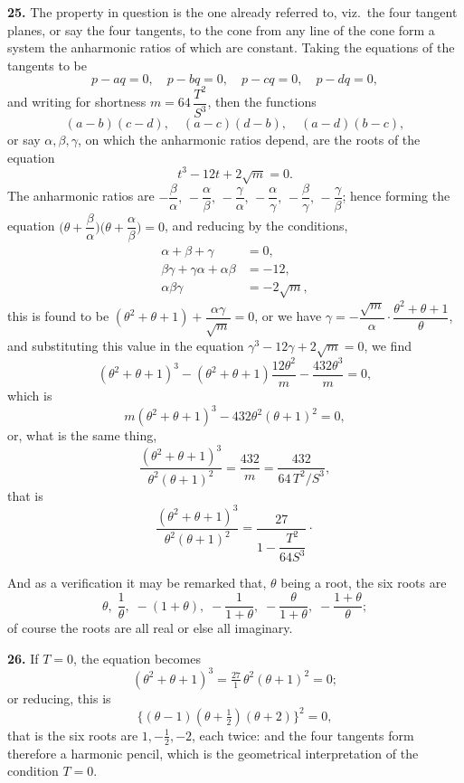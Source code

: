 \documentclass[11pt,a4paper]{article}
\begin{document}
\textbf{25.} The property in question is the one already referred to, viz.\ the four tangent planes, or say the four tangents, to the cone from any line of the cone form a system the anharmonic ratios of which are constant. Taking the equations of the tangents to be
\[
p - aq = 0,\quad p - bq = 0,\quad p - cq = 0,\quad p - dq = 0,
\]
and writing for shortness $m = 64\,\dfrac{T^{2}}{S^{3}}$, then the functions
\[
(a - b)(c - d),\quad (a - c)(d - b),\quad (a - d)(b - c),
\]
or say $\alpha, \beta, \gamma$, on which the anharmonic ratios depend, are the roots of the equation
\[
t^{3} - 12t + 2\sqrt{m} = 0.
\]
The anharmonic ratios are $-\dfrac{\beta}{\alpha},\, -\dfrac{\alpha}{\beta},\, -\dfrac{\gamma}{\alpha},\, -\dfrac{\alpha}{\gamma},\, -\dfrac{\beta}{\gamma},\, -\dfrac{\gamma}{\beta}$; hence forming the equation $\bigl(\theta + \dfrac{\beta}{\alpha}\bigr)\bigl(\theta + \dfrac{\alpha}{\beta}\bigr) = 0$, and reducing by the conditions,
\[
\begin{aligned}
\alpha + \beta + \gamma &= 0,\\
\beta\gamma + \gamma\alpha + \alpha\beta &= -12,\\
\alpha\beta\gamma &= -2\sqrt{m},
\end{aligned}
\]
this is found to be $(\theta^{2} + \theta + 1) + \dfrac{\alpha\gamma}{\sqrt{m}} = 0$, or we have $\gamma = -\dfrac{\sqrt{m}}{\alpha}\cdot\dfrac{\theta^{2} + \theta + 1}{\theta}$, and substituting this value in the equation $\gamma^{3} - 12\gamma + 2\sqrt{m} = 0$, we find
\[
(\theta^{2} + \theta + 1)^{3} - (\theta^{2} + \theta + 1)\frac{12\theta^{2}}{m} - \frac{432\theta^{3}}{m} = 0,
\]
which is
\[
m(\theta^{2} + \theta + 1)^{3} - 432\theta^{2}(\theta + 1)^{2} = 0,
\]
or, what is the same thing,
\[
\frac{(\theta^{2} + \theta + 1)^{3}}{\theta^{2}(\theta + 1)^{2}} = \frac{432}{m} = \frac{432}{64\,T^{2}/S^{3}},
\]
that is
\[
\frac{(\theta^{2} + \theta + 1)^{3}}{\theta^{2}(\theta + 1)^{2}} = \frac{27}{1 - \dfrac{T^{2}}{64S^{3}}}\cdot
\]

And as a verification it may be remarked that, $\theta$ being a root, the six roots are
\[
\theta,\; \frac{1}{\theta},\; -(1 + \theta),\; -\frac{1}{1 + \theta},\; -\frac{\theta}{1 + \theta},\; -\frac{1 + \theta}{\theta};
\]
of course the roots are all real or else all imaginary.

\textbf{26.} If $T = 0$, the equation becomes
\[
(\theta^{2} + \theta + 1)^{3} = \tfrac{27}{1}\,\theta^{2}(\theta + 1)^{2} = 0;
\]
or reducing, this is
\[
\{(\theta - 1)(\theta + \tfrac{1}{2})(\theta + 2)\}^{2} = 0,
\]
that is the six roots are $1, -\tfrac{1}{2}, -2$, each twice: and the four tangents form therefore a harmonic pencil, which is the geometrical interpretation of the condition $T = 0$.
\end{document}
